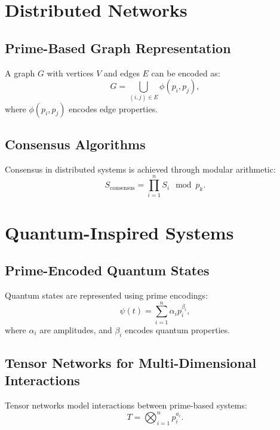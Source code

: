 \documentclass{article}
\theoremstyle{plain}
\begin{document}
\section{Distributed Networks}

\subsection{Prime-Based Graph Representation}
A graph \(G\) with vertices \(V\) and edges \(E\) can be encoded as:
\begin{equation}
    G = \bigcup_{(i,j) \in E} \phi(p_i, p_j),
\end{equation}
where \(\phi(p_i, p_j)\) encodes edge properties.

\subsection{Consensus Algorithms}
Consensus in distributed systems is achieved through modular arithmetic:
\begin{equation}
    S_\text{consensus} = \prod_{i=1}^n S_i \mod p_k.
\end{equation}

\section{Quantum-Inspired Systems}

\subsection{Prime-Encoded Quantum States}
Quantum states are represented using prime encodings:
\begin{equation}
    \psi(t) = \sum_{i=1}^n \alpha_i p_i^{\beta_i},
\end{equation}
where \(\alpha_i\) are amplitudes, and \(\beta_i\) encodes quantum properties.

\subsection{Tensor Networks for Multi-Dimensional Interactions}
Tensor networks model interactions between prime-based systems:
\begin{equation}
    T = \bigotimes_{i=1}^n p_i^{a_i}.
\end{equation}
\end{document}
